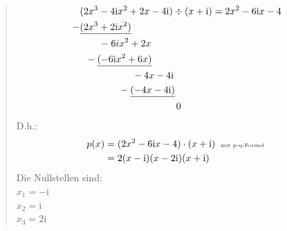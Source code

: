 \begin{quote}
	\begin{align*}
	& (2x^3-4\mathrm{i}x^2+2x-4\mathrm{i})\div(x+\mathrm{i})=2x^2-6\mathrm{i}x-4\\
	-& \underline{(2x^3+2\mathrm{i}x^2)}\\
	& \hspace{0.7cm}-6ix^2+2x\\
	&\hspace{0.2cm}-\underline{(-6\mathrm{i}x^2+6x)}\\
	&\hspace{1.9cm}-4x-4\mathrm{i}\\
	&\hspace{1.4cm}-\underline{(-4x-4\mathrm{i})}\\
	&\hspace{3.5cm} 0
	\end{align*}
	D.h.:\\
	\begin{align*}
	p(x)&=(2x^2-6\mathrm{i}x-4)\cdot(x+\mathrm{i}) \;\; \text{\tiny mit p-q-Formel \normalsize }\\
	&=2(x-\mathrm{i})(x-2\mathrm{i})(x+\mathrm{i})
	\end{align*}
	Die Nullstellen sind:\\
	$ x_1=-\mathrm{i} $\\
	$ x_2=\mathrm{i} $\\
	$ x_3=2\mathrm{i} $\\
	
	
	
\end{quote}
